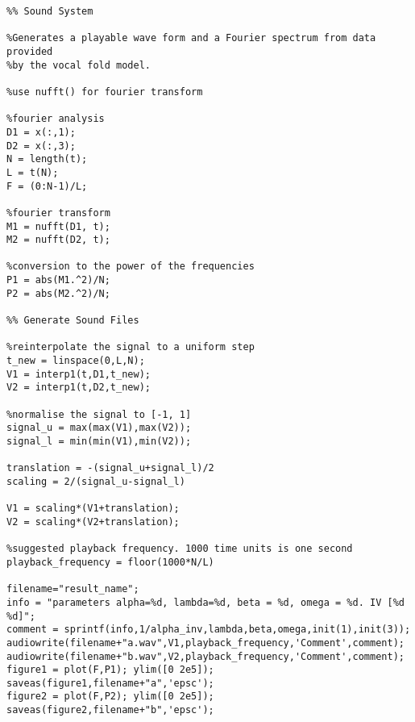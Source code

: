 \documentclass{report}
\begin{document}
\begin{verbatim}
%% Sound System

%Generates a playable wave form and a Fourier spectrum from data provided
%by the vocal fold model.

%use nufft() for fourier transform

%fourier analysis
D1 = x(:,1);
D2 = x(:,3);
N = length(t);
L = t(N);
F = (0:N-1)/L;

%fourier transform
M1 = nufft(D1, t);
M2 = nufft(D2, t);

%conversion to the power of the frequencies
P1 = abs(M1.^2)/N;
P2 = abs(M2.^2)/N;

%% Generate Sound Files

%reinterpolate the signal to a uniform step
t_new = linspace(0,L,N);
V1 = interp1(t,D1,t_new);
V2 = interp1(t,D2,t_new);

%normalise the signal to [-1, 1]
signal_u = max(max(V1),max(V2));
signal_l = min(min(V1),min(V2));

translation = -(signal_u+signal_l)/2
scaling = 2/(signal_u-signal_l)

V1 = scaling*(V1+translation);
V2 = scaling*(V2+translation);

%suggested playback frequency. 1000 time units is one second
playback_frequency = floor(1000*N/L)

filename="result_name";
info = "parameters alpha=%d, lambda=%d, beta = %d, omega = %d. IV [%d %d]";
comment = sprintf(info,1/alpha_inv,lambda,beta,omega,init(1),init(3));
audiowrite(filename+"a.wav",V1,playback_frequency,'Comment',comment);
audiowrite(filename+"b.wav",V2,playback_frequency,'Comment',comment);
figure1 = plot(F,P1); ylim([0 2e5]); saveas(figure1,filename+"a",'epsc');
figure2 = plot(F,P2); ylim([0 2e5]); saveas(figure2,filename+"b",'epsc');
\end{verbatim}
\end{document}
